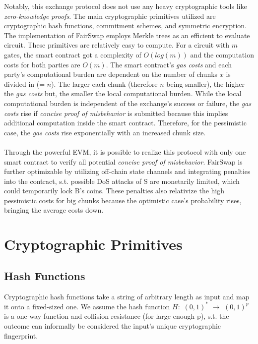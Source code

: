 \documentclass{cacthesis}
\newcounter{protocol}
\begin{document}
        Notably, this exchange protocol does not use any heavy cryptographic tools like \textit{zero-knowledge proofs}. The main cryptographic primitives utilized are cryptographic hash functions, commitment schemes, and symmetric encryption. The implementation of FairSwap employs Merkle trees as an efficient to evaluate circuit. These primitives are relatively easy to compute. For a circuit with $m$ gates, the smart contract got a complexity of $O(log(m))$ and the computation costs for both parties are $O(m)$. The smart contract's \textit{gas costs} and each party's computational burden are dependent on the number of chunks $x$ is divided in (= $n$). The larger each chunk (therefore $n$ being smaller), the higher the \textit{gas costs} but, the smaller the local computational burden. While the local computational burden is independent of the exchange's success or failure, the \textit{gas costs} rise if \textit{concise proof of misbehavior} is submitted because this implies additional computation inside the smart contract. Therefore, for the pessimistic case, the \textit{gas costs} rise exponentially with an increased chunk size. \\\\
        Through the powerful EVM, it is possible to realize this protocol with only one smart contract to verify all potential \textit{concise proof of misbehavior}.
        FairSwap is further optimizable by utilizing off-chain state channels and integrating penalties into the contract, s.t. possible DoS attacks of S are monetarily limited, which could temporarily lock B's coins. These penalties also relativize the high pessimistic costs for big chunks because the optimistic case's probability rises, bringing the average costs down.
                
        \section{Cryptographic Primitives}
	        \subsection{Hash Functions}
	        \label{sub:HashFunctions}
	        Cryptographic hash functions take a string of arbitrary length as input and map it onto a fixed-sized one. We assume the hash function $H:$ $ (0, 1)^*$ $\rightarrow$ $(0, 1)^p$  is a one-way function and collision resistance (for large enough p), s.t. the outcome can informally be considered the input's unique cryptographic fingerprint. 
\end{document}
